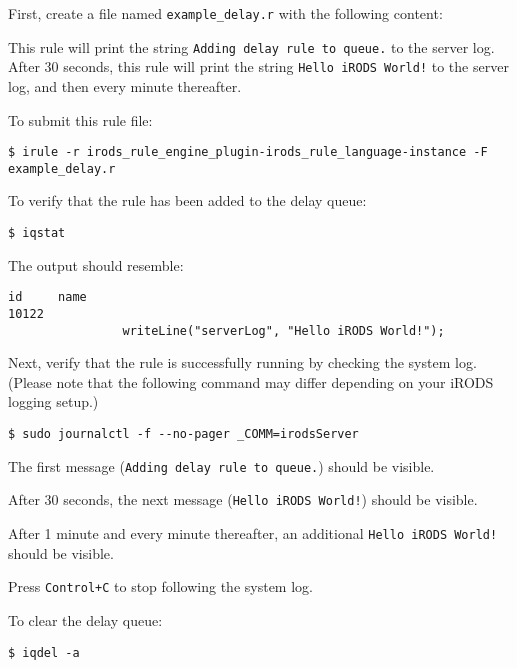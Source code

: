 \documentclass[10pt,oneside]{memoir}
\begin{document}
First, create a file named \texttt{example\_delay.r} with the following content:

\begin{lrbox}{\exampleDelayRule}

\end{lrbox}
\href{https://raw.githubusercontent.com/irods/irods_training/ugm2024/beginner/example_delay.r}{\usebox{\exampleDelayRule}}

This rule will print the string \texttt{Adding delay rule to queue.} to the server log. After 30 seconds, this rule will print the string \texttt{Hello iRODS World!} to the server log, and then every minute thereafter.

To submit this rule file:

\begin{lstlisting}
$ irule -r irods_rule_engine_plugin-irods_rule_language-instance -F example_delay.r
\end{lstlisting}

To verify that the rule has been added to the delay queue:

\begin{lstlisting}
$ iqstat
\end{lstlisting}

The output should resemble:
\begin{lstlisting}
id     name
10122  
                writeLine("serverLog", "Hello iRODS World!");
\end{lstlisting}

Next, verify that the rule is successfully running by checking the system log. (Please note that the following command may differ depending on your iRODS logging setup.)

\begin{lstlisting}
$ sudo journalctl -f --no-pager _COMM=irodsServer
\end{lstlisting}

The first message (\texttt{Adding delay rule to queue.}) should be visible.

After 30 seconds, the next message (\texttt{Hello iRODS World!}) should be visible.

After 1 minute and every minute thereafter, an additional \texttt{Hello iRODS World!} should be visible.

Press \texttt{Control+C} to stop following the system log.

To clear the delay queue:

\begin{lstlisting}
$ iqdel -a
\end{lstlisting}
\end{document}
